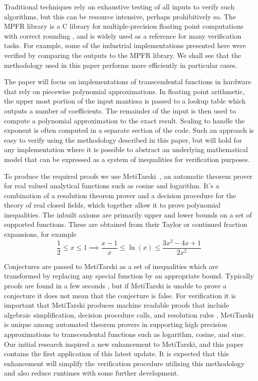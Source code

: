\documentclass[a4]{article}
\begin{document}
Traditional techniques rely on exhaustive testing of all inputs to verify such algorithms, but this can be resource intensive, perhaps prohibitively so. The MPFR library is a C library for multiple-precision floating point computations with correct rounding \cite{fousse2007mpfr}, and is widely used as a reference for many verification tasks. For example, some of the industrial implementations presented here were verified by comparing the outputs to the MPFR library. We shall see that the methodology used in this paper performs more efficiently in particular cases. 


The paper will focus on implementations of transcendental functions in hardware that rely on piecewise polynomial approximations. In floating point arithmetic, the upper most portion of the input mantissa is passed to a lookup table which outputs a number of coefficients. The remainder of the input is then used to compute a polynomial approximation to the exact result. Scaling to handle the exponent is often computed in a separate section of the code. Such an approach is easy to verify using the methodology described in this paper, but will hold for any implementation where it is possible to abstract an underlying mathematical model that can be expressed as a system of inequalities for verification purposes.

To produce the required proofs we use MetiTarski~\cite{akbarpour2010metitarski}, an automatic theorem prover for real valued analytical functions such as cosine and logarithm. It's a combination of a resolution theorem prover and a decision procedure for the theory of real closed fields, which together allow it to prove polynomial inequalities. The inbuilt axioms are primarily upper and lower bounds on a set of supported functions. These are obtained from their Taylor or continued fraction expansions, for example
$$\frac{1}{2} \leq x \leq 1 \implies \frac{x-1}{x} \leq \ln(x) \leq \frac{3x^2-4x+1}{2x^2}$$\newline

Conjectures are passed to MetiTarski as a set of inequalities which are transformed by replacing any special function by an appropriate bound. Typically proofs are found in a few seconds \cite{akbarpour2009applications}, but if MetiTarski is unable to prove a conjecture it does not mean that the conjecture is false. For verification it is important that MetiTarski produces machine readable proofs that include algebraic simplification, decision procedure calls, and resolution rules \cite{denman2009formal}. MetiTarski is unique among automated theorem provers in supporting high precision approximations to transcendental functions such as logarithm, cosine, and sine. Our initial research inspired a new enhancement to MetiTarski, and this paper contains the first application of this latest update. It is expected that this enhancement will simplify the verification procedure utilising this methodology and also reduce runtimes with some further development. 
\end{document}
